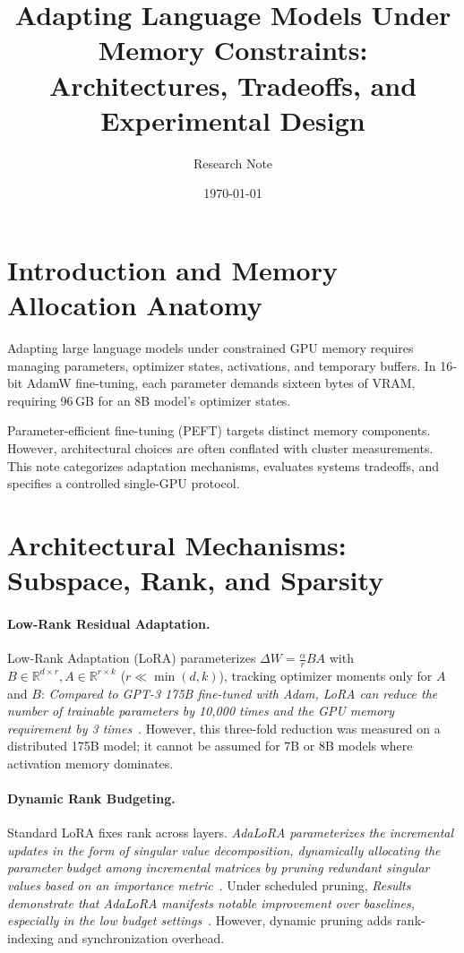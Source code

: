 \documentclass[11pt,a4paper]{article}
\title{\textbf{Adapting Language Models Under Memory Constraints:\\Architectures, Tradeoffs, and Experimental Design}}
\author{Research Note}
\date{\today}
\begin{document}
\maketitle

\section{Introduction and Memory Allocation Anatomy}
Adapting large language models under constrained GPU memory requires managing parameters, optimizer states, activations, and temporary buffers. In 16-bit AdamW fine-tuning, each parameter demands sixteen bytes of VRAM, requiring 96\,GB for an 8B model's optimizer states.

Parameter-efficient fine-tuning (PEFT) targets distinct memory components. However, architectural choices are often conflated with cluster measurements. This note categorizes adaptation mechanisms, evaluates systems tradeoffs, and specifies a controlled single-GPU protocol.

\section{Architectural Mechanisms: Subspace, Rank, and Sparsity}

\paragraph{Low-Rank Residual Adaptation.}
Low-Rank Adaptation (LoRA) parameterizes $\Delta W = \frac{\alpha}{r} B A$ with $B \in \mathbb{R}^{d \times r}, A \in \mathbb{R}^{r \times k}$ ($r \ll \min(d,k)$), tracking optimizer moments only for $A$ and $B$: \textit{Compared to GPT-3 175B fine-tuned with Adam, LoRA can reduce the number of trainable parameters by 10,000 times and the GPU memory requirement by 3 times}~\cite{hu2021lora}. However, this three-fold reduction was measured on a distributed 175B model; it cannot be assumed for 7B or 8B models where activation memory dominates.

\paragraph{Dynamic Rank Budgeting.}
Standard LoRA fixes rank across layers. \textit{AdaLoRA parameterizes the incremental updates in the form of singular value decomposition, dynamically allocating the parameter budget among incremental matrices by pruning redundant singular values based on an importance metric}~\cite{zhang2023adalora}. Under scheduled pruning, \textit{Results demonstrate that AdaLoRA manifests notable improvement over baselines, especially in the low budget settings}~\cite{zhang2023adalora}. However, dynamic pruning adds rank-indexing and synchronization overhead.
\end{document}
